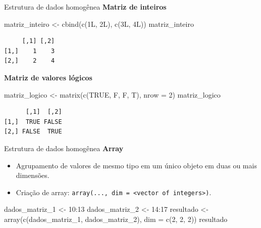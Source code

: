 \documentclass[
  10pt,
  ignorenonframetext,
]{beamer}
\newenvironment{Shaded}{\begin{snugshade}}{\end{snugshade}}
\newcommand{\AttributeTok}[1]{\textcolor[rgb]{0.40,0.45,0.13}{#1}}
\newcommand{\ConstantTok}[1]{\textcolor[rgb]{0.56,0.35,0.01}{#1}}
\newcommand{\DecValTok}[1]{\textcolor[rgb]{0.68,0.00,0.00}{#1}}
\newcommand{\FunctionTok}[1]{\textcolor[rgb]{0.28,0.35,0.67}{#1}}
\newcommand{\NormalTok}[1]{\textcolor[rgb]{0.00,0.23,0.31}{#1}}
\newcommand{\OtherTok}[1]{\textcolor[rgb]{0.00,0.23,0.31}{#1}}
\newcommand{\SpecialCharTok}[1]{\textcolor[rgb]{0.37,0.37,0.37}{#1}}
\providecommand{\tightlist}{%
  \setlength{\itemsep}{0pt}\setlength{\parskip}{0pt}}\usepackage{longtable,booktabs,array}
\begin{document}
\begin{frame}[fragile]{Estrutura de dados homogênea}
\protect\hypertarget{estrutura-de-dados-homoguxeanea-7}{}
\textbf{Matriz de inteiros}

\begin{Shaded}
\begin{Highlighting}[]
\NormalTok{matriz\_inteiro }\OtherTok{\textless{}{-}} \FunctionTok{cbind}\NormalTok{(}\FunctionTok{c}\NormalTok{(1L, 2L), }\FunctionTok{c}\NormalTok{(3L, 4L))}
\NormalTok{matriz\_inteiro}
\end{Highlighting}
\end{Shaded}

\begin{verbatim}
     [,1] [,2]
[1,]    1    3
[2,]    2    4
\end{verbatim}

\textbf{Matriz de valores lógicos}

\begin{Shaded}
\begin{Highlighting}[]
\NormalTok{matriz\_logico }\OtherTok{\textless{}{-}} \FunctionTok{matrix}\NormalTok{(}\FunctionTok{c}\NormalTok{(}\ConstantTok{TRUE}\NormalTok{, F, F, T), }\AttributeTok{nrow =} \DecValTok{2}\NormalTok{)}
\NormalTok{matriz\_logico}
\end{Highlighting}
\end{Shaded}

\begin{verbatim}
      [,1]  [,2]
[1,]  TRUE FALSE
[2,] FALSE  TRUE
\end{verbatim}
\end{frame}

\begin{frame}[fragile]{Estrutura de dados homogênea}
\protect\hypertarget{estrutura-de-dados-homoguxeanea-8}{}
\textbf{Array}

\begin{itemize}
\tightlist
\item
  Agrupamento de valores de mesmo tipo em um único objeto em duas ou
  mais dimensões.
\item
  Criação de array:
  \texttt{array(...,\ dim\ =\ \textless{}vector\ of\ integers\textgreater{})}.
\end{itemize}

\begin{Shaded}
\begin{Highlighting}[]
\NormalTok{dados\_matriz\_1 }\OtherTok{\textless{}{-}} \DecValTok{10}\SpecialCharTok{:}\DecValTok{13}
\NormalTok{dados\_matriz\_2  }\OtherTok{\textless{}{-}} \DecValTok{14}\SpecialCharTok{:}\DecValTok{17}
\NormalTok{resultado }\OtherTok{\textless{}{-}} \FunctionTok{array}\NormalTok{(}\FunctionTok{c}\NormalTok{(dados\_matriz\_1, dados\_matriz\_2),}
                  \AttributeTok{dim =} \FunctionTok{c}\NormalTok{(}\DecValTok{2}\NormalTok{, }\DecValTok{2}\NormalTok{, }\DecValTok{2}\NormalTok{))}
\NormalTok{resultado}
\end{Highlighting}
\end{Shaded}
\end{frame}
\end{document}
